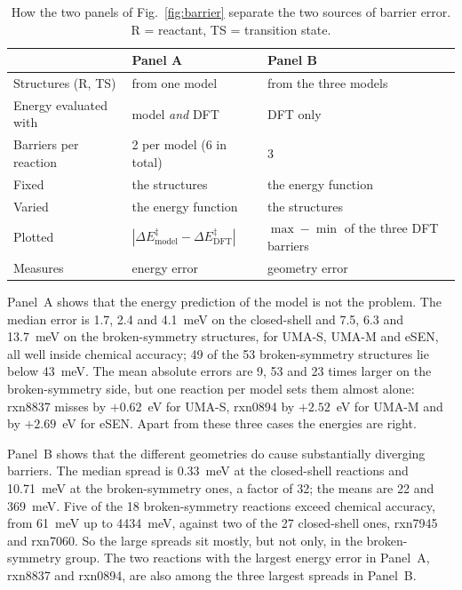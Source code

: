 \begin{table}[t]
  \centering
  \small
  \begin{tabular}{@{}lll@{}}
    \toprule
                          & Panel A                        & Panel B \\
    \midrule
    Structures (R, TS)    & from one model                 & from the three models \\
    Energy evaluated with & model \emph{and} DFT           & DFT only \\
    Barriers per reaction & 2 per model (6 in total)       & 3 \\
    Fixed                 & the structures                 & the energy function \\
    Varied                & the energy function            & the structures \\
    Plotted               & $|\Delta E^\ddagger_\mathrm{model} - \Delta E^\ddagger_\mathrm{DFT}|$
                          & $\max - \min$ of the three DFT barriers \\
    Measures              & energy error                   & geometry error \\
    \bottomrule
  \end{tabular}
  \caption{How the two panels of Fig.~\ref{fig:barrier} separate the two
  sources of barrier error. R = reactant, TS = transition state.}
  \label{tab:panels}
\end{table}

Panel~A shows that the energy prediction of the model is not the
problem. The median error is 1.7,
2.4 and 4.1~meV on the closed-shell and 7.5, 6.3 and 13.7~meV on the
broken-symmetry structures, for UMA-S, UMA-M and eSEN, all well inside
chemical accuracy; 49 of the 53 broken-symmetry structures lie below 43~meV.
The mean absolute errors are 9, 53 and 23 times larger on the broken-symmetry
side, but one reaction per model sets them almost alone: rxn8837 misses by
$+0.62$~eV for UMA-S, rxn0894 by $+2.52$~eV for UMA-M and by $+2.69$~eV for
eSEN. Apart from these three cases the energies are
right.

Panel~B shows that the different geometries do cause substantially
diverging barriers. The median spread is 0.33~meV at the closed-shell
reactions and 10.71~meV at the broken-symmetry ones, a factor of 32; the
means are 22 and 369~meV. Five of the 18 broken-symmetry reactions exceed
chemical accuracy, from 61~meV up to 4434~meV, against two of the 27
closed-shell ones, rxn7945 and rxn7060. So the large spreads sit
mostly, but not only, in the broken-symmetry group. The two reactions with the
largest energy error in Panel~A, rxn8837 and rxn0894, are also among the
three largest spreads in Panel~B.

